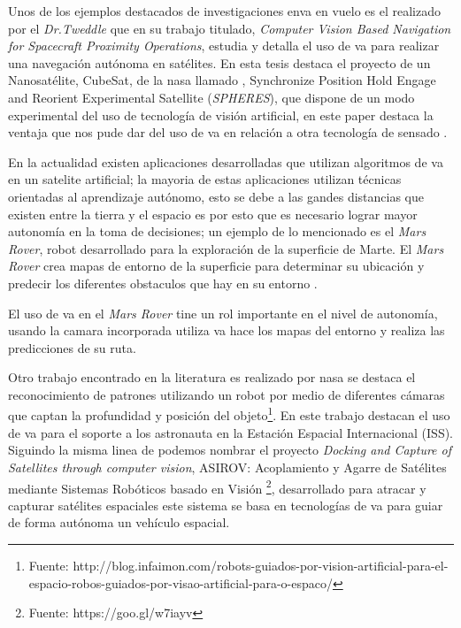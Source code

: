 Unos de los ejemplos destacados de investigaciones en\ac{va} en vuelo es el realizado por el \textit{Dr.Tweddle} que en su trabajo titulado, \textit{Computer Vision Based Navigation for Spacecraft Proximity Operations}, estudia y detalla el uso de \ac{va} para realizar una navegación autónoma en satélites. En esta tesis destaca el proyecto de un Nanosatélite, CubeSat, de la \ac{nasa} llamado , Synchronize Position Hold Engage and Reorient Experimental Satellite (\textit{SPHERES}), que dispone de un modo experimental del uso de tecnología de visión artificial, en este paper destaca la ventaja que nos pude dar del uso de \ac{va} en relación a otra tecnología de sensado \citep{Brent}.

En la actualidad existen aplicaciones desarrolladas que utilizan algoritmos de \ac{va} en un satelite artificial; la mayoria de estas aplicaciones utilizan técnicas orientadas al aprendizaje autónomo, esto se debe a las gandes distancias que existen entre la tierra y el espacio es por esto que es necesario lograr mayor autonomía en la toma de decisiones; un ejemplo de lo mencionado es el \textit{Mars Rover}, robot desarrollado para la exploración de la superficie de Marte. El \textit{Mars Rover} crea mapas de entorno de la superficie para determinar su ubicación y predecir los diferentes obstaculos que hay en su entorno \citep{RoverMars}.

El uso de \ac{va} en el \textit{Mars Rover} tine un rol importante en el nivel de autonomía, usando la camara incorporada utiliza \ac{va}  hace los mapas del entorno y realiza las predicciones de su ruta. 

Otro trabajo encontrado en la literatura es realizado por \ac{nasa} se destaca el reconocimiento de patrones utilizando un robot por medio de diferentes cámaras que captan la profundidad y posición del objeto\footnote{Fuente: 
http://blog.infaimon.com/robots-guiados-por-vision-artificial-para-el-espacio-robos-guiados-por-visao-artificial-para-o-espaco/}. En este trabajo destacan el uso de \ac{va} para el soporte a los astronauta en la Estación Espacial Internacional (ISS). Siguindo la misma linea de podemos nombrar el proyecto \textit{Docking and Capture of Satellites through computer vision}, ASIROV: Acoplamiento y Agarre de Satélites mediante Sistemas Robóticos basado en Visión \footnote{Fuente: https://goo.gl/w7iayv}, desarrollado para atracar y capturar satélites espaciales este sistema se basa  en tecnologías de \ac{va} para guiar de forma autónoma un vehículo espacial.


